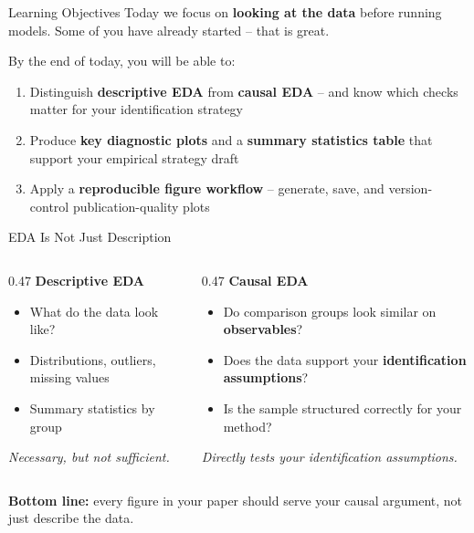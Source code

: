 \begin{frame}{Learning Objectives}
  Today we focus on \textbf{looking at the data} before running models. Some of you have already started -- that is great.

  \vspace{6pt}

  By the end of today, you will be able to:

  \vspace{4pt}

  \begin{enumerate}
    \item Distinguish \textbf{descriptive EDA} from \textbf{causal EDA} -- and know which checks matter for your identification strategy
    \item Produce \textbf{key diagnostic plots} and a \textbf{summary statistics table} that support your empirical strategy draft
    \item Apply a \textbf{reproducible figure workflow} -- generate, save, and version-control publication-quality plots
  \end{enumerate}
\end{frame}

\begin{frame}{EDA Is Not Just Description}
  \begin{columns}[T]
    \begin{column}{0.47\textwidth}
      \textbf{Descriptive EDA}
      \begin{itemize}
        \item What do the data look like?
        \item Distributions, outliers, missing values
        \item Summary statistics by group
      \end{itemize}

      \vspace{4pt}

      \textit{Necessary, but not sufficient.}
    \end{column}
    \begin{column}{0.47\textwidth}
      \textbf{\textcolor{usfgreen}{Causal EDA}}
      \begin{itemize}
        \item Do comparison groups look similar on \textbf{observables}?
        \item Does the data support your \textbf{identification assumptions}?
        \item Is the sample structured correctly for your method?
      \end{itemize}

      \vspace{4pt}

      \textit{Directly tests your identification assumptions.}
    \end{column}
  \end{columns}

  \vspace{8pt}

  \textbf{Bottom line:} every figure in your paper should serve your causal argument, not just describe the data.
\end{frame}

